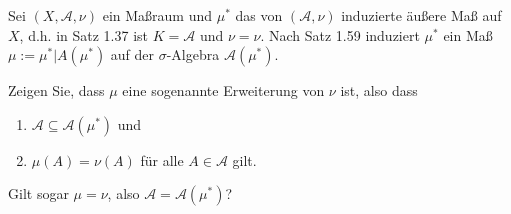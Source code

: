 \begin{Problem}
	 Sei $(X, \mathcal{A}, \nu)$ ein Maßraum und $\mu^*$ das von $(\mathcal{A}, \nu)$ induzierte äußere Maß auf $X$, d.h. in Satz 1.37 ist $K = \mathcal{A}$ und $\nu=\nu$. Nach Satz 1.59 induziert $\mu^*$ ein Maß $\mu := \mu^* |A(\mu^*)$ auf der $\sigma$-Algebra $\mathcal{A}(\mu^*)$.
	 \begin{parts}
	 \item Zeigen Sie, dass $\mu$ eine sogenannte Erweiterung von $\nu$ ist, also dass
		 \begin{enumerate}[label=(\arabic*)]
			 \item $\mathcal{A}\subseteq \mathcal{A}(\mu^*)$ und
			 \item $\mu(A)=\nu(A)$ f\"{u}r alle $A\in \mathcal{A}$ gilt.
		 \end{enumerate}
	 \item Gilt sogar $\mu=\nu$, also $\mathcal{A}=\mathcal{A}(\mu^*)$?
	 \end{parts}
\end{Problem}

